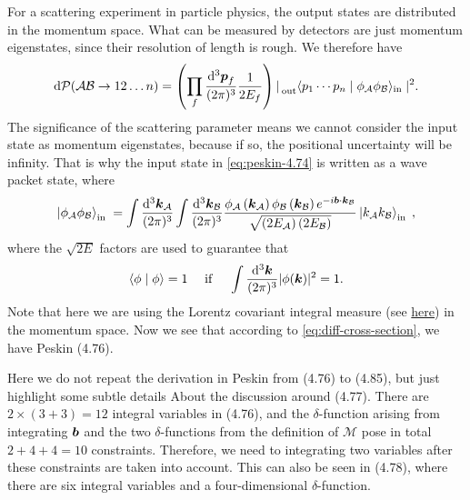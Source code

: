 \documentclass[hyperref, a4paper]{article}
\begin{document}
For a scattering experiment in particle physics, the output states are distributed in the momentum space. 
What can be measured by detectors are just momentum eigenstates, since their resolution of length is rough.
We therefore have 
\begin{equation}
    \dd\mathcal{P}(\mathcal{A B} \rightarrow 12 \ldots n)=\left(\prod_{f} \frac{\dd^{3} \vb*{p}_{f}}{(2 \pi)^{3}} \frac{1}{2 E_{f}}\right) | \prescript{}{\text{out}} \langle {p}_{1} \cdots {p}_{n} \mid \phi_{\mathcal{A}} \phi_{\mathcal{B}}\rangle_{\text {in }}|^{2}.
    \label{eq:peskin-4.74}
\end{equation} 
The significance of the scattering parameter means we cannot consider the input state as momentum eigenstates, 
because if so, the positional uncertainty will be infinity. That is why the input state in \eqref{eq:peskin-4.74} 
is written as a wave packet state, where 
\begin{equation}
    \left|\phi_{\mathcal{A}} \phi_{\mathcal{B}}\right\rangle_{\text {in }}=\int \frac{\dd^{3} \vb*{k}_{\mathcal{A}}}{(2 \pi)^{3}} \int \frac{\dd^{3} \vb*{k}_{\mathcal{B}}}{(2 \pi)^{3}} \frac{\phi_{\mathcal{A}}\left(\vb*{k}_{\mathcal{A}}\right) \phi_{\mathcal{B}}\left(\vb*{k}_{\mathcal{B}}\right) e^{-i \vb*{b} \cdot \vb*{k}_{\mathcal{B}}}}{\sqrt{\left(2 E_{\mathcal{A}}\right)\left(2 E_{\mathcal{B}}\right)}}\left|{k}_{\mathcal{A}} {k}_{\mathcal{B}}\right\rangle_{\text {in }},
\end{equation}
where the $\sqrt{2 E}$ factors are used to guarantee that 
\begin{equation}
    \langle\phi \mid \phi\rangle=1 \quad \text { if } \quad \int \frac{\dd^{3} \vb*{k}}{(2 \pi)^{3}}|\phi(\vb*{k})|^{2}=1.
\end{equation}
Note that here we are using the Lorentz covariant integral measure (see \href{../qft1-homework/1/1.pdf}{here})
in the momentum space. Now we see that according to \eqref{eq:diff-cross-section}, we have Peskin (4.76).

Here we do not repeat the derivation in Peskin from (4.76) to (4.85), but just highlight some subtle details
About the discussion around (4.77). There are $2 \times (3 + 3) = 12$ integral variables in (4.76),
and the $\delta$-function arising from integrating $\vb*{b}$ and the two $\delta$-functions from 
the definition of $\mathcal{M}$ pose in total $2 + 4 + 4 = 10$ constraints. Therefore, we need to 
integrating two variables after these constraints are taken into account. This can also be seen in 
(4.78), where there are six integral variables and a four-dimensional $\delta$-function.
\end{document}
